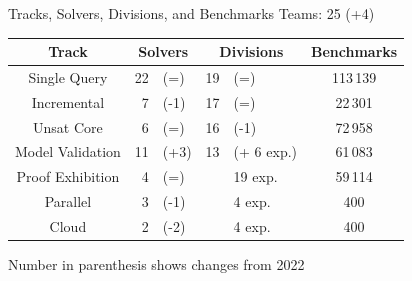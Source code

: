 \documentclass[table]{beamer}
\def\emph#1{\textcolor{MYblue}{#1}}
\begin{document}




\begin{frame}{Tracks, Solvers, Divisions, and Benchmarks}
  Teams: 25 (+4) %
  \bigskip

  \begin{tabular}{c|r@{}l|r@{}l|c}
    Track & \multicolumn{2}{c|}{Solvers} & \multicolumn{2}{c|}{Divisions}  & Benchmarks \\
    \hline
    Single Query  &  22&(=)  & 19&(=)  & 113\,139 \\
    Incremental &  7&(-1)   & 17&(=)  & 22\,301   \\
    Unsat Core  &  6&(=)   & 16&(-1)  & 72\,958  \\
    Model Validation  &  11&(+3)    &  13& (+ 6 exp.)  & 61\,083  \\
    Proof Exhibition  &  4&(=)    &  & 19 exp.  & 59\,114  \\
    \hline
    Parallel &   3&(-1)      &   &4 exp.  & 400 \\
    Cloud & 2&(-2)      &  &4 exp.  & 400 \\

  \end{tabular}
  \bigskip

  Number in parenthesis shows changes from 2022
\end{frame}
\end{document}
